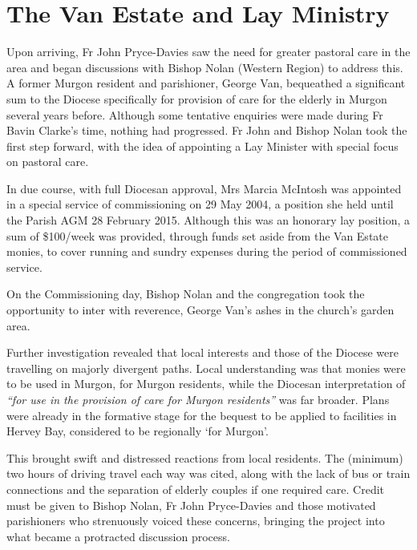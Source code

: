 \section{The Van Estate and Lay Ministry}



Upon arriving, Fr John Pryce-Davies saw the need for greater pastoral care in the area and began discussions with Bishop Nolan (Western Region) to address this. A former Murgon resident and parishioner, George Van, bequeathed a significant sum to the Diocese specifically for provision of care for the elderly in Murgon several years before. Although some tentative enquiries were made during Fr Bavin Clarke's time, nothing had progressed. Fr John and Bishop Nolan took the first step forward, with the idea of appointing a Lay Minister with special focus on pastoral care.



In due course, with full Diocesan approval, Mrs Marcia McIntosh was appointed in a special service of commissioning on 29 May 2004, a position she held until the Parish AGM 28 February 2015. Although this was an honorary lay position, a sum of \$100/week was provided, through funds set aside from the Van Estate monies, to cover running and sundry expenses during the period of commissioned service.



On the Commissioning day, Bishop Nolan and the congregation took the opportunity to inter with reverence, George Van's ashes in the church's garden area.



Further investigation revealed that local interests and those of the Diocese were travelling on majorly divergent paths. Local understanding was that monies were to be used in Murgon, for Murgon residents, while the Diocesan interpretation of \emph{``for use in the provision of care for Murgon residents''} was far broader. Plans were already in the formative stage for the bequest to be applied to facilities in Hervey Bay, considered to be regionally `for Murgon'.



This brought swift and distressed reactions from local residents. The (minimum) two hours of driving travel each way was cited, along with the lack of bus or train connections and the separation of elderly couples if one required care. Credit must be given to Bishop Nolan, Fr John Pryce-Davies and those motivated parishioners who strenuously voiced these concerns, bringing the project into what became a protracted discussion process.




